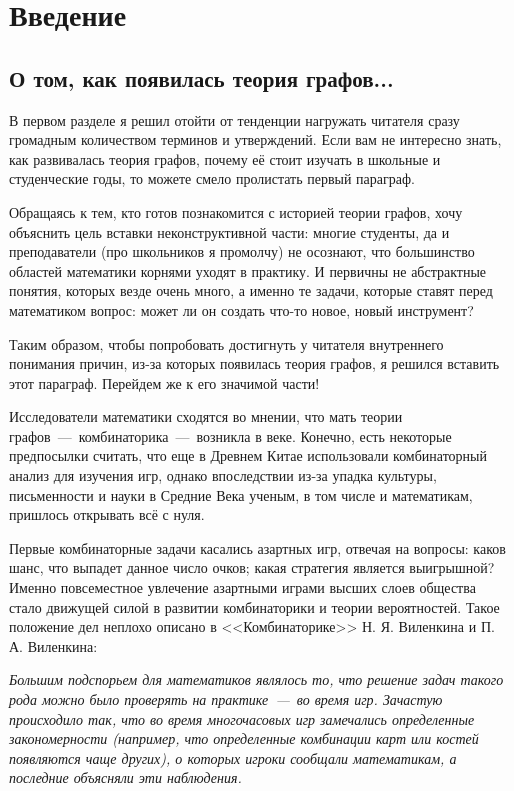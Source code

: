 \sloppy
\chapter{Введение}
\section{О том, как появилась теория графов...}

	В первом разделе я решил отойти от тенденции нагружать читателя сразу громадным количеством терминов и утверждений. Если вам не интересно знать, как развивалась теория графов, почему её стоит изучать в школьные и студенческие годы, то можете смело пролистать первый параграф. 
	
	Обращаясь к тем, кто готов познакомится с историей теории графов, хочу объяснить цель вставки неконструктивной части: многие студенты, да и преподаватели (про школьников я промолчу) не осознают, что большинство областей математики корнями уходят в практику. И первичны не абстрактные понятия, которых везде очень много, а именно те задачи, которые ставят перед математиком вопрос: может ли он создать что-то новое, новый инструмент?
	
	Таким образом, чтобы попробовать достигнуть у читателя внутреннего понимания причин, из-за которых появилась теория графов, я решился вставить этот параграф. Перейдем же к его значимой части!


	Исследователи математики сходятся во мнении, что мать теории графов~---~комбинаторика~---~возникла в  веке. Конечно, есть некоторые предпосылки считать, что еще в Древнем Китае использовали комбинаторный анализ для изучения игр, однако впоследствии из-за упадка культуры, письменности и науки в Средние Века ученым, в том числе и математикам, пришлось открывать всё с нуля.
	
	Первые комбинаторные задачи касались азартных игр, отвечая на вопросы: каков шанс, что выпадет данное число очков; какая стратегия является выигрышной? Именно повсеместное увлечение азартными играми высших слоев общества стало движущей силой в развитии комбинаторики и теории вероятностей. Такое положение дел неплохо описано в <<Комбинаторике>> Н. Я. Виленкина и П. А. Виленкина:
	
\begin{displayquote}
	\textit{Большим подспорьем для математиков являлось то, что решение задач такого рода можно было проверять на практике~---~во время игр. Зачастую происходило так, что во время многочасовых игр замечались определенные закономерности (например, что определенные комбинации карт или костей появляются чаще других), о которых игроки сообщали математикам, а последние объясняли эти наблюдения. }
\end{displayquote}

